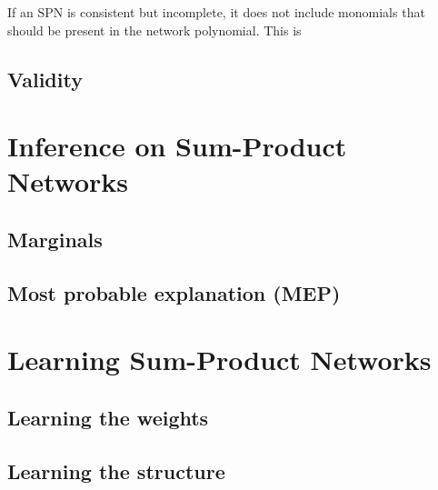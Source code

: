 \documentclass[a4paper,10pt]{article}
\theoremstyle{plain}
\begin{document}
If an SPN is consistent but incomplete, it does not include monomials that should be present in the
network polynomial. This is

\subsection{Validity}

\section{Inference on Sum-Product Networks}

\subsection{Marginals}

\subsection{Most probable explanation (MEP)}

\section{Learning Sum-Product Networks}

\subsection{Learning the weights}

\subsection{Learning the structure}
\end{document}
